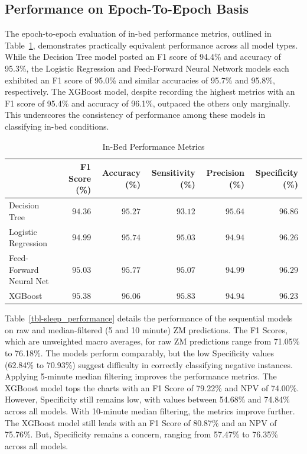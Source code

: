 \documentclass[
  super,
  preprint,
  3p]{elsarticle}
\begin{document}
\hypertarget{performance-on-epoch-to-epoch-basis}{%
\subsection{Performance on Epoch-To-Epoch
Basis}\label{performance-on-epoch-to-epoch-basis}}

The epoch-to-epoch evaluation of in-bed performance metrics, outlined in
Table~\ref{tbl-in_bed_performance}, demonstrates practically equivalent
performance across all model types. While the Decision Tree model posted
an F1 score of 94.4\% and accuracy of 95.3\%, the Logistic Regression
and Feed-Forward Neural Network models each exhibited an F1 score of
95.0\% and similar accuracies of 95.7\% and 95.8\%, respectively. The
XGBoost model, despite recording the highest metrics with an F1 score of
95.4\% and accuracy of 96.1\%, outpaced the others only marginally. This
underscores the consistency of performance among these models in
classifying in-bed conditions.

\hypertarget{tbl-in_bed_performance}{}
\begin{longtable}{lrrrrr}
\caption{\label{tbl-in_bed_performance}In-Bed Performance Metrics }\tabularnewline

\toprule
 & F1 Score (\%) & Accuracy (\%) & Sensitivity (\%) & Precision (\%) & Specificity (\%) \\ 
\midrule
Decision Tree & $94.36$ & $95.27$ & $93.12$ & $95.64$ & $96.86$ \\ 
Logistic Regression & $94.99$ & $95.74$ & $95.03$ & $94.94$ & $96.26$ \\ 
Feed-Forward Neural Net & $95.03$ & $95.77$ & $95.07$ & $94.99$ & $96.29$ \\ 
XGBoost & $95.38$ & $96.06$ & $95.83$ & $94.94$ & $96.23$ \\ 
\bottomrule
\end{longtable}

Table~\ref{tbl-sleep_performance} details the performance of the
sequential models on raw and median-filtered (5 and 10 minute) ZM
predictions. The F1 Scores, which are unweighted macro averages, for raw
ZM predictions range from 71.05\% to 76.18\%. The models perform
comparably, but the low Specificity values (62.84\% to 70.93\%) suggest
difficulty in correctly classifying negative instances. Applying
5-minute median filtering improves the performance metrics. The XGBoost
model tops the charts with an F1 Score of 79.22\% and NPV of 74.00\%.
However, Specificity still remains low, with values between 54.68\% and
74.84\% across all models. With 10-minute median filtering, the metrics
improve further. The XGBoost model still leads with an F1 Score of
80.87\% and an NPV of 75.76\%. But, Specificity remains a concern,
ranging from 57.47\% to 76.35\% across all models.
\end{document}
